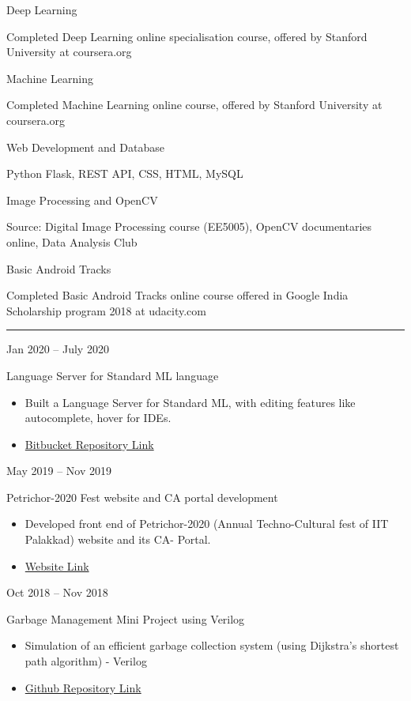 \documentclass[a4paper,10pt]{article}
\newlength{\cvcolumngapwidth}
\newlength{\cvleftcolumnwidth}
\newlength{\cvrightcolumnwidth}
\newcommand{\cvsectionstyle}[1]{{\normalsize\cvsectionfont\textcolor{cvsectioncolor}{#1}}}
\newcommand{\cvtitlestyle}[1]{{\large\cvtitlefont\textcolor{cvtitlecolor}{#1}}}
\newcommand{\cvdurationstyle}[1]{{\small\cvdurationfont\textcolor{cvdurationcolor}{#1}}}
\newcommand{\cvheadingstyle}[1]{{\normalsize\cvheadingfont\textcolor{cvheadingcolor}{#1}}}
\newlength{\cvafteritemskipamount}
\newlength{\cvaftersectionskipamount}
\newlength{\cvbetweensectionandheadingextraskipamount}
\newlength{\cvaftertitleskipamount}
\newlength{\cvparskip}
\newcommand{\cvsection}[1]{
    \begin{minipage}[t]{\cvleftcolumnwidth}
        \raggedleft\cvsectionstyle{#1}
    \end{minipage}%
    \hspace{\cvcolumngapwidth}%
    \begin{minipage}[t]{\cvrightcolumnwidth}
        \textcolor{cvrulecolor}{\rule{\cvrightcolumnwidth}{0.3mm}}
    \end{minipage}

    \vspace{\cvaftersectionskipamount}
}
\newcommand{\cvitem}[2]{
    \begin{minipage}[t]{\cvleftcolumnwidth}
        \raggedleft #1
    \end{minipage}%
    \hspace{\cvcolumngapwidth}%
    \begin{minipage}[t]{\cvrightcolumnwidth}
        \setlength{\parskip}{\cvparskip} #2
    \end{minipage}

    \vspace{\cvafteritemskipamount}
}
\newcommand{\cvtitle}[1]{
    \cvtitlestyle{#1}

    \vspace{\cvaftertitleskipamount}
    \vspace{-\cvparskip}
}
\begin{document}
\cvitem{
    \cvheadingstyle{Deep Learning}
}{
    Completed Deep Learning online specialisation course, offered by Stanford University at coursera.org
}

\cvitem{
    \cvheadingstyle{Machine Learning}
}{
    Completed Machine Learning online course, offered by Stanford University at coursera.org
}

\cvitem{
    \cvheadingstyle{Web Development and Database}
}{
   Python Flask, REST API, CSS, HTML, MySQL
}

\cvitem{
    \cvheadingstyle{Image Processing and OpenCV}
}{
    
    Source: Digital Image Processing course (EE5005), OpenCV documentaries online, Data Analysis Club 
    
}

\cvitem{
    \cvheadingstyle{Basic Android Tracks}
}{
    
   Completed Basic Android Tracks online course offered in Google India Scholarship program 2018 at udacity.com
}

\cvsection{PROJECTS}

\vspace{\cvbetweensectionandheadingextraskipamount}

\cvitem{
    \cvdurationstyle{Jan 2020 -- July 2020}
}{
    \cvtitle{Language Server for Standard ML language}

    \begin{itemize}[leftmargin=*]
        \item Built a Language Server for Standard ML, with editing features like autocomplete, hover for IDEs.

        \item \href{https://bitbucket.org/Shruti_Umat/language-server-for-sml/src/master/}{Bitbucket Repository Link}
    \end{itemize}
}


\cvitem{
    \cvdurationstyle{May 2019 -- Nov 2019}
}{
    \cvtitle{Petrichor-2020 Fest website and CA portal development  }

    \begin{itemize}[leftmargin=*]
        \item Developed front end of Petrichor-2020 (Annual Techno-Cultural fest of IIT Palakkad) website and its CA- Portal.
        \item \href{http://petrichor-ca.herokuapp.com/}{Website Link}
    \end{itemize}
}

\cvitem{
    \cvdurationstyle{Oct 2018 -- Nov 2018}
}{
    \cvtitle{Garbage Management Mini Project using Verilog}
    \begin{itemize}[leftmargin=*]
        \item Simulation of an efficient garbage collection system (using Dijkstra's shortest path algorithm) - Verilog
        \item \href{https://github.com/RathoreDevansh08/Garbage\_Management\_MiniProject}{Github Repository Link} 
        
    \end{itemize}
}
\end{document}
